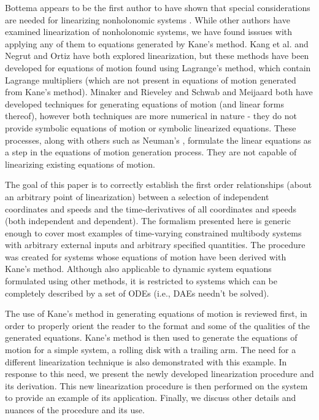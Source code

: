 \documentclass[smallcondensed,final]{svjour3}                     %
\begin{document}
Bottema appears to be the first author to have shown that special
considerations are needed for linearizing nonholonomic systems
\cite{Bottema1949}.
While other authors have examined linearization of nonholonomic systems, we
have found isssues with applying any of them to equations generated by Kane's
method.
Kang et al. \cite{Kang2003} and Negrut and Ortiz \cite{Negrut2006} have both
explored linearization, but these methods have been developed for equations of
motion found using Lagrange's method, which contain Lagrange multipliers (which
are not present in equations of motion generated from Kane's method).
Minaker and Rieveley \cite{Minaker2010} and Schwab and Meijaard
\cite{Schwab2003} both have developed techniques for generating equations of
motion (and linear forms thereof), however both techniques are more numerical
in nature - they do not provide symbolic equations of motion or symbolic
linearized equations.
These processes, along with others such as Neuman's %
, formulate the linear equations as a step in the equations of motion
generation process.
They are not capable of linearizing existing equations of motion.

The goal of this paper is to correctly establish the first order relationships
(about an arbitrary point of linearization) between a selection of independent
coordinates and speeds and the time-derivatives of all coordinates and speeds
(both independent and dependent). The formalism presented here is generic
enough to cover most examples of time-varying constrained multibody systems
with arbitrary external inputs and arbitrary specified quantities.
The
procedure was created for systems whose equations of motion have been derived
with Kane's method. Although also applicable to dynamic system equations
formulated using other methods, it is restricted to systems which can be
completely described by a set of ODEs (i.e., DAEs needn't be solved).

The use of Kane's method in generating equations of motion is reviewed first,
in order to properly orient the reader to the format and some of the qualities
of the generated equations.
Kane's method is then used to generate the equations of motion for a simple
system,
a rolling disk with a trailing arm.
The need for a different linearization technique is also demonstrated with this
example.
In response to this need, we present the newly developed linearization
procedure and its derivation.
This new linearization procedure is then performed on the system to provide an
example of its application.
Finally, we discuss other details and nuances of the procedure and its use.
\end{document}
